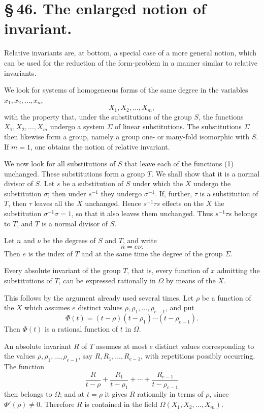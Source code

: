 \documentclass[11pt]{article}
\begin{document}
\section*{\S\,46. The enlarged notion of invariant.}

Relative invariants are, at bottom, a special case of a more general notion, which can be used for the reduction of the form-problem in a manner similar to relative invariants.

We look for systems of homogeneous forms of the same degree in the variables $x_1,x_2,\ldots,x_n$,
\begin{equation}
X_1,X_2,\ldots,X_m,
\tag{1}
\end{equation}
with the property that, under the substitutions of the group $S$, the functions $X_1,X_2,\ldots,X_m$ undergo a system $\Sigma$ of linear substitutions. The substitutions $\Sigma$ then likewise form a group, namely a group one- or many-fold isomorphic with $S$. If $m=1$, one obtains the notion of relative invariant.

We now look for all substitutions of $S$ that leave each of the functions (1) unchanged. These substitutions form a group $T$. We shall show that it is a normal divisor of $S$. Let $s$ be a substitution of $S$ under which the $X$ undergo the substitution $\sigma$; then under $s^{-1}$ they undergo $\sigma^{-1}$. If, further, $\tau$ is a substitution of $T$, then $\tau$ leaves all the $X$ unchanged. Hence $s^{-1}\tau s$ effects on the $X$ the substitution $\sigma^{-1}\sigma=1$, so that it also leaves them unchanged. Thus $s^{-1}\tau s$ belongs to $T$, and $T$ is a normal divisor of $S$.

Let $n$ and $\nu$ be the degrees of $S$ and $T$, and write
\[
n=e\nu.
\]
Then $e$ is the index of $T$ and at the same time the degree of the group $\Sigma$.

Every absolute invariant of the group $T$, that is, every function of $x$ admitting the substitutions of $T$, can be expressed rationally in $\Omega$ by means of the $X$.

This follows by the argument already used several times. Let $\rho$ be a function of the $X$ which assumes $e$ distinct values $\rho,\rho_1,
\ldots,\rho_{e-1}$, and put
\begin{equation}
\Phi(t)=(t-\rho)(t-\rho_1)\cdots(t-\rho_{e-1}).
\tag{2}
\end{equation}
Then $\Phi(t)$ is a rational function of $t$ in $\Omega$.

An absolute invariant $R$ of $T$ assumes at most $e$ distinct values corresponding to the values $\rho,\rho_1,\ldots,\rho_{e-1}$, say $R,R_1,\ldots,R_{e-1}$, with repetitions possibly occurring. The function
\[
\frac{R}{t-\rho}+\frac{R_1}{t-\rho_1}+\cdots+\frac{R_{e-1}}{t-\rho_{e-1}}
\]
then belongs to $\Omega$; and at $t=\rho$ it gives $R$ rationally in terms of $\rho$, since $\Phi'(\rho)\neq0$. Therefore $R$ is contained in the field $\Omega(X_1,X_2,\ldots,X_m)$.
\end{document}
